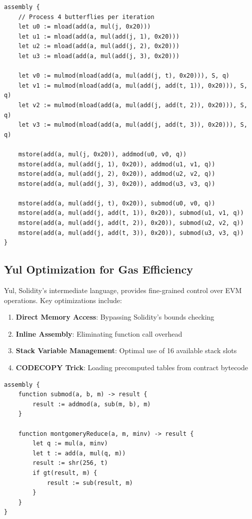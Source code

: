 \begin{lstlisting}[caption={Unrolled Butterfly Operations}]
assembly {
    // Process 4 butterflies per iteration
    let u0 := mload(add(a, mul(j, 0x20)))
    let u1 := mload(add(a, mul(add(j, 1), 0x20)))
    let u2 := mload(add(a, mul(add(j, 2), 0x20)))
    let u3 := mload(add(a, mul(add(j, 3), 0x20)))

    let v0 := mulmod(mload(add(a, mul(add(j, t), 0x20))), S, q)
    let v1 := mulmod(mload(add(a, mul(add(j, add(t, 1)), 0x20))), S, q)
    let v2 := mulmod(mload(add(a, mul(add(j, add(t, 2)), 0x20))), S, q)
    let v3 := mulmod(mload(add(a, mul(add(j, add(t, 3)), 0x20))), S, q)

    mstore(add(a, mul(j, 0x20)), addmod(u0, v0, q))
    mstore(add(a, mul(add(j, 1), 0x20)), addmod(u1, v1, q))
    mstore(add(a, mul(add(j, 2), 0x20)), addmod(u2, v2, q))
    mstore(add(a, mul(add(j, 3), 0x20)), addmod(u3, v3, q))

    mstore(add(a, mul(add(j, t), 0x20)), submod(u0, v0, q))
    mstore(add(a, mul(add(j, add(t, 1)), 0x20)), submod(u1, v1, q))
    mstore(add(a, mul(add(j, add(t, 2)), 0x20)), submod(u2, v2, q))
    mstore(add(a, mul(add(j, add(t, 3)), 0x20)), submod(u3, v3, q))
}
\end{lstlisting}

\subsection{Yul Optimization for Gas Efficiency}

Yul, Solidity's intermediate language, provides fine-grained control over EVM operations. Key optimizations include:

\begin{enumerate}
\item \textbf{Direct Memory Access}: Bypassing Solidity's bounds checking
\item \textbf{Inline Assembly}: Eliminating function call overhead
\item \textbf{Stack Variable Management}: Optimal use of 16 available stack slots
\item \textbf{CODECOPY Trick}: Loading precomputed tables from contract bytecode
\end{enumerate}

\begin{lstlisting}[caption={Yul-Optimized Modular Arithmetic}]
assembly {
    function submod(a, b, m) -> result {
        result := addmod(a, sub(m, b), m)
    }

    function montgomeryReduce(a, m, minv) -> result {
        let q := mul(a, minv)
        let t := add(a, mul(q, m))
        result := shr(256, t)
        if gt(result, m) {
            result := sub(result, m)
        }
    }
}
\end{lstlisting}


